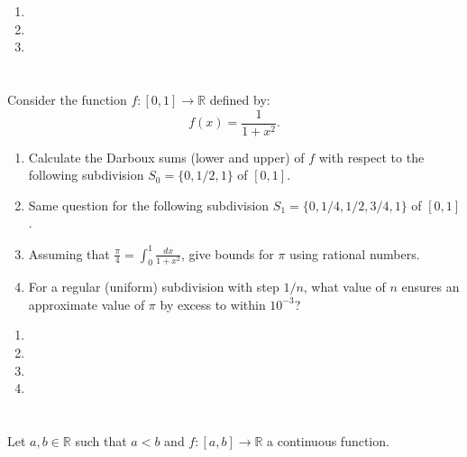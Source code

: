\documentclass[12pt]{article}
\begin{document}
\begin{correctionbox}
	\begin{enumerate}
		\item
		\item
		\item
	\end{enumerate}
\end{correctionbox}

\section{}
Consider the function $f: [0, 1] \rightarrow \mathbb{R}$ defined by:
\[
	f(x) = \frac{1}{1 + x^2}.
\]

\begin{enumerate}
	\item Calculate the Darboux sums (lower and upper) of $f$ with respect to the following subdivision $S_0 = \{0, 1/2, 1\}$ of $[0, 1]$.
	\item Same question for the following subdivision $S_1 = \{0, 1/4, 1/2, 3/4, 1\}$ of $[0, 1]$.
	\item Assuming that $\frac{\pi}{4} = \int_0^1 \frac{dx}{1 + x^2}$, give bounds for $\pi$ using rational numbers.
	\item For a regular (uniform) subdivision with step $1/n$, what value of $n$ ensures an approximate value of $\pi$ by excess to within $10^{-3}$?
\end{enumerate}

\begin{correctionbox}
	\begin{enumerate}
		\item
		\item
		\item
		\item
	\end{enumerate}
\end{correctionbox}

\section{}
Let $a, b \in \mathbb{R}$ such that $a < b$ and $f: [a, b] \rightarrow \mathbb{R}$ a continuous function.
\end{document}
